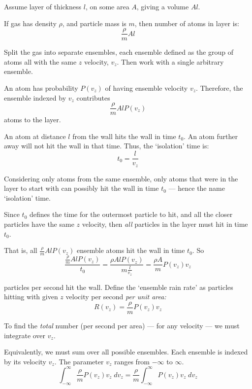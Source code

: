 \documentclass{paper}
\begin{document}
\vspace{1em}
Assume layer of thickness $l$, on some area $A$, giving a volume $Al$.

If gas has density $\rho$, and particle mass is $m$, then number of atoms in layer is: \[ \frac{\rho}{m} A l \]

\vspace{1em}
Split the gas into separate ensembles, each ensemble defined as the group of atoms all with the same $z$ velocity, $v_{z}$.  Then work with a single arbitrary ensemble.

An atom has probability $P(v_{z})$ of having ensemble velocity $v_{z}$.
Therefore, the ensemble indexed by $v_{z}$ contributes \[ \frac{\rho}{m} A l P(v_{z}) \] atoms to the layer.

\vspace{1em}
An atom at distance $l$ from the wall hits the wall in time $t_{0}$. An atom further away will not hit the wall in that time. Thus, the `isolation' time is:
\[ t_{0} = \frac {l} {v_{z}} \]

Considering only atoms from the same ensemble, only atoms that were in the layer to start with can possibly hit the wall in time $t_{0}$ --- hence the name `isolation' time.


\vspace{1em}
Since $t_{0}$ defines the time for the outermost particle to hit, and all the closer particles have the same $z$ velocity, then \emph{all} particles in the layer must hit in time $t_{0}$.

\vspace*{1em}
That is, all $ \frac{\rho}{m} A l P(v_{z}) $ ensemble atoms hit the wall in time $t_{0}$. So
\[ \frac{ \frac{\rho}{m} A l P(v_{z})  }{t_{0}} 
 = \frac{\rho A l P(v_{z})}{ m \frac{l}{v_{z}}} =
 \frac{\rho A}{m} P(v_{z}) v_{z} \] 
 
particles per second hit the wall.  Define the `ensemble rain rate' as particles hitting with given $z$ velocity per second \emph{per unit area:} 
\[ R(v_{z}) = \frac{\rho}{m} P(v_{z}) v_{z} \]

To find the \emph{total} number (per second per area) --- for any velocity --- we must integrate over $v_{z}$.

Equivalently, we must sum over all possible ensembles.  Each ensemble is indexed by its velocity $v_{z}$. The parameter $v_{z}$ ranges from $-\infty$ to $\infty$.
\[ \int_{-\infty}^{\infty} \frac{\rho}{m} P(v_{z}) v_{z} \;dv_{z} 
= \frac{\rho}{m} \int_{-\infty}^{\infty}  P(v_{z}) v_{z} \;dv_{z} \]
\end{document}
